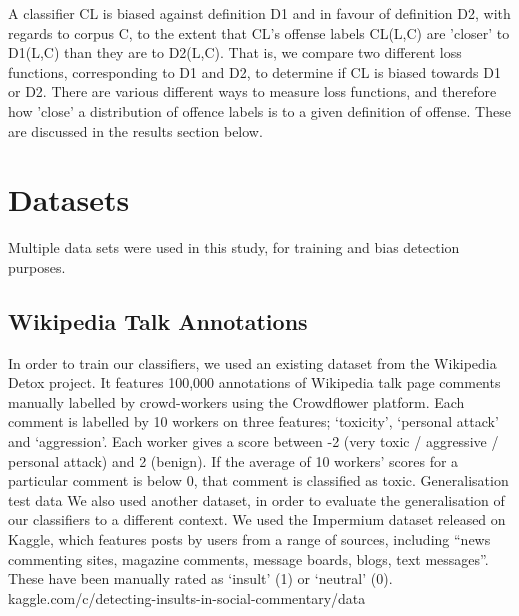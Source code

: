 \documentclass[runningheads,a4paper]{llncs}
\begin{document}
A classifier CL is biased​ against definition D1 and in favour of definition D2, with regards to corpus C, to the extent that CL's offense labels CL(L,C) are 'closer' to D1(L,C) than they are to D2(L,C). That is, we compare two different loss functions, corresponding to D1 and D2, to determine if CL is biased towards D1 or D2. There are various different ways to measure loss functions, and therefore how 'close' a distribution of offence labels is to a given definition of offense. These are discussed in the results section below.



 
\section{Datasets}
Multiple data sets were used in this study, for training and bias detection purposes.

\subsection{Wikipedia Talk Annotations}

In order to train our classifiers, we used an existing dataset from the Wikipedia Detox project. It features 100,000 annotations of Wikipedia talk page comments manually labelled by crowd-workers using the Crowdflower platform. Each comment is labelled by 10 workers on three features; ‘toxicity’, ‘personal attack’ and ‘aggression’. Each worker gives a score between -2 (very toxic / aggressive / personal attack) and 2 (benign). If the average of 10 workers’ scores for a particular comment is below 0, that comment is classified as toxic.  
Generalisation test data
We also used another dataset, in order to evaluate the generalisation of our classifiers to a different context. We used the Impermium dataset released on Kaggle, which features posts by users from a range of sources, including “news commenting sites, magazine comments, message boards, blogs, text messages”. These have been manually rated as ‘insult’ (1) or ‘neutral’ (0). kaggle.com/c/detecting-insults-in-social-commentary/data
\end{document}
